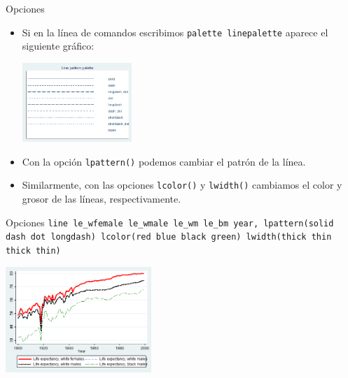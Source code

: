 \documentclass{beamer}
\begin{document}
\begin{frame}{Opciones}
\begin{itemize}
\item Si en la línea de comandos escribimos \texttt{palette linepalette} aparece el siguiente gráfico:\\\smallskip
\centerline{\includegraphics[height=3cm]{pale.png}}
\item Con la opción \texttt{lpattern()} podemos cambiar el patrón de la línea.
\item Similarmente, con las opciones \texttt{lcolor()} y \texttt{lwidth()} cambiamos el color y grosor de las líneas, respectivamente. 
\end{itemize}
\end{frame}

\begin{frame}{Opciones}{}
{\footnotesize \texttt{line le\_wfemale le\_wmale le\_wm le\_bm year, lpattern(solid dash dot longdash) lcolor(red blue black green) lwidth(thick thin thick thin)}}\\\medskip
\centerline{\includegraphics[height=4cm]{pale1.png}}
\end{frame}
\end{document}
